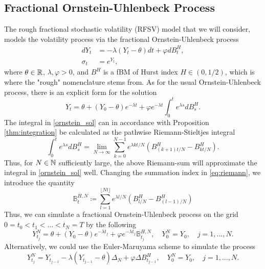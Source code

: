 \subsection{Fractional Ornstein-Uhlenbeck Process}
The rough fractional stochastic volatility (RFSV) model that we will consider, models the volatility process via the fractional Ornstein-Uhlenbeck process
\begin{align}
    dY_{t}&= -\lambda(Y_{t}-\theta)dt + \varphi dB^{H}_{t},\\
    \sigma_{t} &= e^{Y_{t}},
\end{align}
where $\theta\in \mathbb{R}$, $\lambda,\varphi >0$, and $B^{H}$ is a fBM of Hurst index $H\in(0,1/2)$, which is where the "rough" nomenclature stems from. As for the usual Ornstein-Uhlenbeck process, there is an explicit form for the solution
\begin{equation}\label{ornstein_sol}
    Y_{t}= \theta + (Y_{0}-\theta)e^{-\lambda t} + \varphi e^{-\lambda t}\int_{0}^{t}e^{\lambda s}dB_{s}^{H}.
\end{equation}
The integral in \eqref{ornstein_sol} can in accordance with Proposition \ref{thm:integration} be calculated as the pathwise Riemann-Stieltjes integral
\begin{equation}\label{eq:riemann}
    \int_{0}^{t}e^{\lambda s}dB_{s}^{H}=\lim_{N\to\infty}\sum_{k=0}^{N-1}e^{\lambda k t/N}\left(B_{(k+1)t/N}^{H}-B_{kt/N}^{H}\right).
\end{equation}
Thus, for $N\in\mathbb{N}$ sufficiently large, the above Riemann-sum will approximate the integral in \eqref{ornstein_sol} well. Changing the summation index in \eqref{eq:riemann}, we introduce the quantity
\begin{equation}
    \mathbb{B}_{t}^{H,N}\coloneqq \sum_{l=1}^{\lfloor Nt\rfloor }e^{\lambda l/N}\left(B^{H}_{l/N}-B^{H}_{(l-1)/N}\right)
\end{equation}
Thus, we can simulate a fractional Ornstein-Uhlenbeck process on the grid $0=t_{0}<t_{1}<\dots<t_{N}=T$ by the following 
\begin{equation}\label{fou_exact}
    Y_{t_{j}}^{N}=\theta + (Y_{0}-\theta)e^{-\lambda t_{j}} + \varphi e^{-\lambda t_{j}}\mathbb{B}_{t_{j}}^{H,N},\quad Y_{0}^{N}=Y_{0}, \quad j=1,\dots,N.
\end{equation}
Alternatively, we could use the Euler-Maruyama scheme to simulate the process
\begin{equation}\label{fou_euler}
    Y_{t_{j}}^{N}=Y_{t_{j-1}} -\lambda(Y_{t_{j-1}}-\theta)\Delta_{N} + \varphi\Delta B_{t_{j-1}}^{H},\quad Y_{0}^{N}=Y_{0},\quad j=1,\dots,N.
\end{equation}
